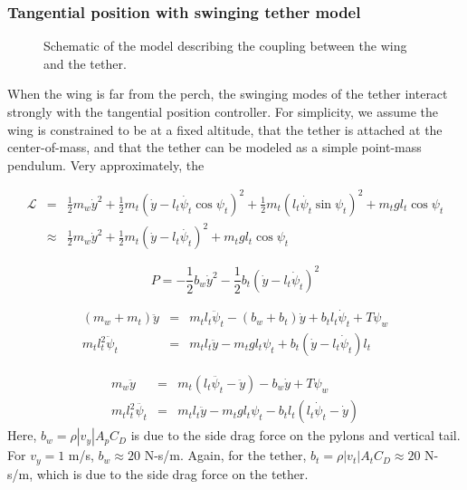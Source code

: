 \documentclass[11pt]{amsart}
\begin{document}
\newpage
\subsubsection{Tangential position with swinging tether model}

\begin{figure}[h]
  \caption{Schematic of the model describing the coupling between the
    wing and the tether.}
\end{figure}
When the wing is far from the perch, the swinging modes of the tether
interact strongly with the tangential position controller.  For
simplicity, we assume the wing is constrained to be at a fixed
altitude, that the tether is attached at the center-of-mass, and that
the tether can be modeled as a simple point-mass pendulum.  Very
approximately, the 

\begin{eqnarray}
\mathcal{L} &=& \frac{1}{2} m_w \dot{y}^2 +
\frac{1}{2} m_t (\dot{y} - l_t \dot{\psi_t} \cos \psi_t)^2 +
\frac{1}{2} m_t (l_t \dot{\psi_t} \sin \psi_t)^2 +
m_t g l_t \cos \psi_t \\
&\approx& \frac{1}{2} m_w \dot{y}^2 +
\frac{1}{2} m_t (\dot{y} - l_t \dot{\psi_t})^2 +
m_t g l_t \cos \psi_t
\end{eqnarray}

\begin{equation}
P = -\frac{1}{2} b_w \dot{y}^2 - \frac{1}{2} b_t (\dot{y} - l_t \dot{\psi}_t)^2
\end{equation}

\begin{eqnarray}
(m_w + m_t) \ddot{y} &=& m_t l_t \ddot{\psi}_t - (b_w + b_t) \dot{y}
+ b_t l_t \dot{\psi}_t + T \psi_w \\
m_t l_t^2 \ddot{\psi}_t &=& m_t l_t \ddot{y} - m_t g l_t \psi_t +
b_t(\dot{y} - l_t \dot{\psi}_t) l_t
\end{eqnarray}


\begin{eqnarray}
m_w \ddot{y} &=& m_t (l_t \ddot{\psi_t} - \ddot{y}) - b_w \dot{y} + T \psi_w \\
m_t l_t^2 \ddot{\psi_t} &=& m_t l_t \ddot{y} - m_t g l_t \psi_t -
b_t l_t (l_t \dot{\psi}_t - \dot{y})
\end{eqnarray}
Here, $b_w = \rho |v_y| A_p C_D$ is due to the side drag force on the
pylons and vertical tail.  For $v_y = 1$ m/s, $b_w \approx 20$ N-s/m.
Again, for the tether, $b_t = \rho |v_t| A_t C_D \approx 20$ N-s/m,
which is due to the side drag force on the tether.
\end{document}
